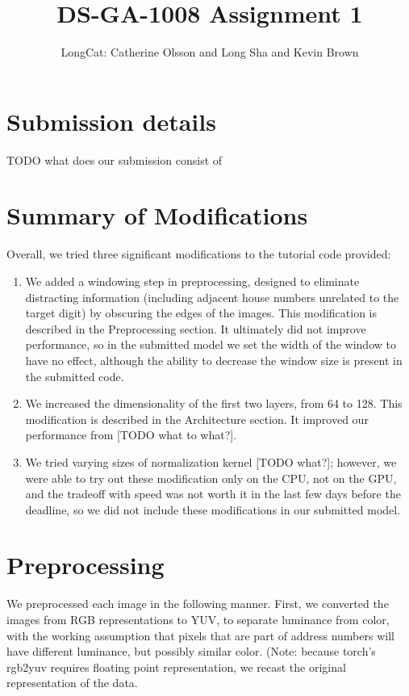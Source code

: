 \documentclass{article}
\title{DS-GA-1008 Assignment 1}
\author{LongCat: Catherine Olsson and Long Sha and Kevin Brown}
\begin{document}
 \maketitle


\section{Submission details}

TODO what does our submission consist of

\section{Summary of Modifications}

Overall, we tried three significant modifications to the tutorial code
provided: \begin{enumerate} \item We added a windowing step in preprocessing,
designed to eliminate distracting information (including adjacent house numbers
unrelated to the target digit) by obscuring the edges of the images. This
modification is described in the Preprocessing section. It ultimately did not
improve performance, so in the submitted model we set the width of the window
to have no effect, although the ability to decrease the window size is present
in the submitted code.  \item We increased the dimensionality of the first two
layers, from 64 to 128. This modification is described in the Architecture
section. It improved our performance from [TODO what to what?].  \item We tried
varying sizes of normalization kernel [TODO what?]; however, we were able to
try out these modification only on the CPU, not on the GPU, and the tradeoff
with speed was not worth it in the last few days before the deadline, so we did
not include these modifications in our submitted model.  \end{enumerate}

\section{Preprocessing} \label{preprocessing}

We preprocessed each image in the following manner. First, we converted the
images from RGB representations to YUV, to separate luminance from color, with
the working assumption that pixels that are part of address numbers will have
different luminance, but possibly similar color. (Note: because torch's rgb2yuv
requires floating point representation, we recast the original representation of
the data. \\
\end{document}
